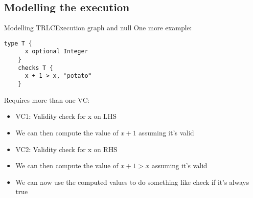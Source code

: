 \documentclass[aspectratio=169]{beamer}
\begin{document}
\subsection{Modelling the execution}
\begin{frame}[fragile]{Modelling TRLC}{Execution graph and null}
  One more example:
  \begin{lstlisting}[language=TRLC,gobble=4]
    type T {
      x optional Integer
    }
    checks T {
      x + 1 > x, "potato"
    }
  \end{lstlisting}
  \pause
  Requires more than one VC:
  \begin{itemize}
  \item VC1: Validity check for x on LHS
  \item We can then compute the value of $x + 1$ assuming it's valid
    \pause
  \item VC2: Validity check for x on RHS
  \item We can then compute the value of $x + 1 > x$ assuming it's valid
    \pause
  \item We can now use the computed values to do something like check
    if it's always true
  \end{itemize}
\end{frame}
\end{document}

